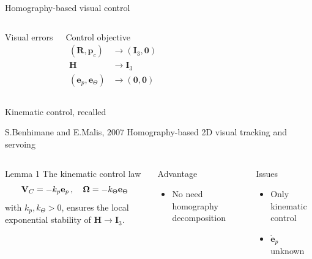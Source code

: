 \documentclass{beamer}
\begin{document}
\begin{frame}{Homography-based visual control}
\begin{columns}
\begin{block}{Visual errors}
	\end{block}
	\begin{block}{Control objective}
		\[
		\begin{array}{rl}
		(\mathbf{R}, \mathbf{p}_c) & \longrightarrow (\mathbf{I}_3, \mathbf{0})\\
		\mathbf{H} & \longrightarrow \mathbf{I}_3\\
		(\mathbf{e}_p, \mathbf{e}_\Theta) & \longrightarrow (\mathbf{0}, \mathbf{0})
		\end{array}
		\]	
	\end{block}
	
\end{columns}

\end{frame}

\begin{frame}{Kinematic control, recalled}
	\begin{block}{S.Benhimane and E.Malis, 2007}
		Homography-based 2D visual tracking and servoing
	\end{block}
	\begin{columns}
		\begin{block}{Lemma 1}
			The kinematic control law
			\vspace{-0.2cm}
			\begin{equation*}\label{maliscontrol}
			\mathbf{V}_{C} = -k_p \mathbf{e}_p\,,\quad \mathbf{\Omega} = -k_\Theta \mathbf{e}_\Theta 
			\vspace{-0.2cm} 
			\end{equation*}
			with $k_p, k_\Theta>0$, ensures the local exponential stability of $\mathbf{H}  \longrightarrow \mathbf{I}_3$.
		\end{block}
		\begin{block}{Advantage}
			\begin{itemize}
				\item No need homography decomposition				
			\end{itemize}
		\end{block}
		
		\begin{block}{Issues}
			\begin{itemize}
				\item Only kinematic control
				\item $\dot{\mathbf{e}}_p$ unknown
			\end{itemize}
		\end{block}
	\end{columns}
\end{frame}
\end{document}
